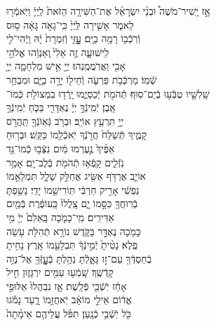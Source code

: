\documentclass[twoside, openany, parskip=half, 11pt]{book}
\begin{document}
אָ֣ז \hfill
יָֽשִׁיר־מֹשֶׁה֩ \hfill וּבְנֵ֨י \hfill יִשְׂרָאֵ֜ל \hfill אֶת־הַשִּׁירָ֤ה \hfill הַזֹּאת֙ \hfill לַֽיְיָ֔ \hfill וַיֹּֽאמְֿר֖וּ \\
לֵאמֹ֑ר \hfill אָשִׁ֤ירָה לַּֽיְיָ֙ כִּֽי־גָאֹ֣ה גָּאָ֔ה \hfill ס֥וּס \\
וְֿרֹֽכְֿב֖וֹ רָמָ֥ה בַיָּֽם׃ \hfill עׇׇׇָזִּ֤י וְֿזִמְרָת֙ יָ֔הּ וַֽיְֿהִי־לִ֖י \\
לִֽישׁוּעָ֑ה \hfill זֶ֤ה אֵלִי֙ ֽוְאַנְוֵ֔הוּ \hfill אֱלֹהֵ֥י \\
אָבִ֖י וַאֲרֹֽמֲמֶֽנְהוּ׃ \hfill יְיָ֖ אִ֣ישׁ מִלְחָמָ֑ה יְיָ֖ \\
שְֿׁמֽוֹ׃ \hfill מַרְכְּֿבֹ֥ת פַּרְעֹ֛ה וְֿחֵיל֖וֹ יָרָ֣ה בַיָּ֑ם \hfill וּמִבְחַ֥ר\\
שָֽׁלִשָׁ֖יו טֻבְֹּֿע֥וּ בְֿיַם־סֽוּף׃ \hfill תְּֿהֹמֹ֖ת יְֿכַסְיֻ֑מוּ יָֽרְֿד֥וּ בִמְצוֹלֹ֖ת כְּֿמוֹ־\\
אָֽבֶן׃ \hfill יְֿמִֽינְֿךָ֣ יְיָ֔ נֶאְדָּרִ֖י בַּכֹּ֑חַ \hfill יְֿמִֽינְֿךָ֥ \\
יְיָ֖ תִּרְעַ֥ץ אוֹיֵֽב׃ \hfill וּבְרֹ֥ב גְּֿאֽוֹנְֿךָ֖ תַּֽהֲרֹ֣ס \\
קָמֶ֑יךָ \hfill תְּֿשַׁלַּח֙ חֲרֹ֣נְֿךָ יֹֽאכְֿלֵ֖מוֹ כַּקַּֽשׁ׃ \hfill וּבְר֤וּחַ \\
אַפֶּ֨יךָ֙ נֶ֣עֶרְמוּ מַ֔יִם \hfill נִצְּֿב֥וּ כְֿמוֹ־נֵ֖ד \\
נֹֽזְֿלִ֑ים \hfill קָֽפְֿא֥וּ תְֿהֹמֹ֖ת בְּֿלֶב־יָֽם׃ \hfill אָמַ֥ר \\
אוֹיֵ֛ב אֶרְדֹּ֥ף אַשִּׂ֖יג \hfill אֲחַלֵּ֣ק שָׁלָ֑ל תִּמְלָאֵ֣מוֹ \\
נַפְשִׁ֔י \hfill אָרִ֣יק חַרְבִּ֔י תּֽוֹרִישֵׁ֖מוֹ יָדִֽי׃ \hfill נָשַׁ֥פְתָּ \\
בְֿרֽוּחֲךָ֖ כִּסָּ֣מוֹ יָ֑ם \hfill צָֽלֲלוּ֙ כַּֽעוֹפֶ֔רֶת בְּֿמַ֖יִם \\
אַדִּירִֽים׃ \hfill מִֽי־כָמֹ֤כָה בָּֽאֵלִם֙ יְיָ֔ \hfill מִ֥י \\
כָּמֹ֖כָה נֶאְדָּ֣ר בַּקֹּ֑דֶשׁ \hfill נוֹרָ֥א תְֿהִלֹּ֖ת עֹ֥שֵׂה \\
פֶֽלֶא׃ \hfill נָטִ֨יתָ֙ יְֿמִ֣ינְֿךָ֔ תִּבְלָעֵ֖מוֹ אָֽרֶץ׃ \hfill נָחִ֥יתָ \\
בְֿחַסְדְּֿךָ֖ עַם־ז֣וּ גָּאָ֑לְֿתָּ \hfill נֵהַ֥לְתָּ בְֿעׇׇׇׇׇָזְּֿךָ֖ אֶל־נְוֵ֥ה \\
קָדְֿשֶֽׁךָ׃ \hfill שָֽׁמְֿע֥וּ עַמִּ֖ים יִרְגָּז֑וּן \hfill חִ֣יל \\
אָחַ֔ז יֹֽשְֿׁבֵ֖י פְּֿלָֽשֶׁת׃ \hfill אָ֤ז נִבְהֲלוּ֙ אַלּוּפֵ֣י \\
אֱד֔וֹם \hfill אֵילֵ֣י מוֹאָ֔ב יֹֽאחֲזֵ֖מוֹ רָ֑עַד \hfill נָמֹ֕גוּ\\
כֹּ֖ל יֹֽשְֿׁבֵ֥י כְֿנָֽעַן׃ \hfill תִּפֹּ֨ל עֲלֵיהֶ֤ם אֵימָ֨תָה֙ \\
\end{document}
